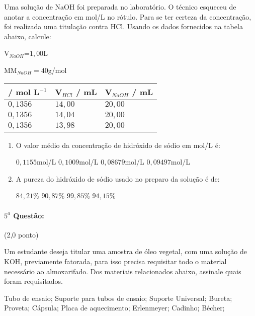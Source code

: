 \documentclass[12pt,a4paper]{article}
\begin{document}
Uma solução de NaOH foi preparada no laboratório. O técnico esqueceu de anotar a concentração em mol/L no rótulo. Para se ter 
certeza da concentração, foi realizada uma titulação contra HCl. Usando os dados fornecidos na tabela abaixo, calcule:

V$_{NaOH}$=$1,00$L

MM$_{NaOH}=40$g/mol

\begin{center}
\begin{tabular}{|l|l|l|}
\hline 
[HCl] / mol L$^{-1}$ & V$_{HCl}$ / mL & V$_{NaOH}$ / mL \\ \hline
$0,1356$ & $14,00$ & $20,00$ \\ \hline
$0,1356$ & $14,04$ & $20,00$ \\ \hline
$0,1356$ & $13,98$ & $20,00$ \\ \hline
\end{tabular}
\end{center}


\begin{enumerate}[label=\Roman*]
\item O valor médio da concentração de hidróxido de sódio em mol/L é:
\begin{tasks}
\task $0,1155$mol/L
\task $0,1009$mol/L
\task $0,08679$mol/L
\task $0,09497$mol/L
\end{tasks}
\item A pureza do hidróxido de sódio usado no preparo da solução é de:
\begin{tasks}
\task $84,21\%$
\task $90,87\%$
\task $99,85\%$
\task $94,15\%$
\end{tasks}
\end{enumerate}

\paragraph{$5^a$ Questão:} (2,0 ponto)

Um estudante deseja titular uma amostra de óleo vegetal, com uma solução de KOH, previamente fatorada, para isso
precisa requisitar todo o material necessário ao almoxarifado. Dos materiais relacionados abaixo, assinale quais foram
requisitados.
\begin{tasks}
\task Tubo de ensaio;
\task Suporte para tubos de ensaio;
\task Suporte Universal;
\task Bureta;
\task Proveta;
\task Cápsula;
\task Placa de aquecimento;
\task Erlenmeyer;
\task Cadinho;
\task Bécher;
\end{tasks}
\end{document}
